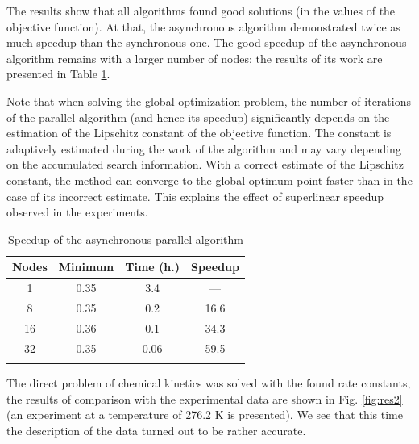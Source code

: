 \documentclass{svproc}
\begin{document}
The results show that all algorithms found good solutions (in the values of the objective function). At that, the asynchronous algorithm demonstrated twice as much speedup than the synchronous one. The good speedup of the asynchronous algorithm remains with a larger number of nodes; the results of its work are presented in Table \ref{tab_parall}.

Note that when solving the global optimization problem, the number of iterations of the parallel algorithm (and hence its speedup) significantly depends on the estimation of the Lipschitz constant of the objective function. The constant is adaptively estimated during the work of the algorithm and may vary depending on the accumulated search information. With a correct estimate of the Lipschitz constant, the method can converge to the global optimum point faster than in the case of its incorrect estimate. This explains the effect of superlinear speedup observed in the experiments.

\begin{table}
\caption{Speedup of the asynchronous parallel algorithm}
\label{tab_parall}
\begin{center}
\begin{tabular}{cccc}
\hline\noalign{\smallskip}
Nodes  & Minimum  & Time (h.) & Speedup \\
\hline\noalign{\smallskip}
1  & 0.35   &   3.4     &   ---        \\
8  & 0.35   &   0.2     &   16.6       \\
16 & 0.36   &   0.1     &   34.3       \\
32 & 0.35   &   0.06    &   59.5       \\
\noalign{\smallskip}\hline
\end{tabular}\end{center}\end{table}

The direct problem of chemical kinetics was solved with the found rate constants, the results of comparison with the experimental data are shown in Fig. \ref{fig:res2} (an experiment at a temperature of 276.2 K is presented). We see that this time the description of the data turned out to be rather accurate.
\end{document}
